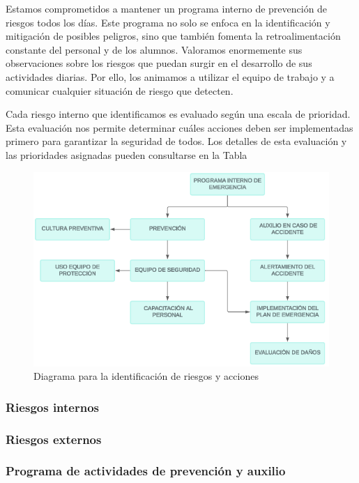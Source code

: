     Estamos comprometidos a mantener un programa interno de prevención de riesgos todos los días. Este programa no solo se enfoca en la identificación y mitigación de posibles peligros, sino que también fomenta la retroalimentación constante del personal y de los alumnos. Valoramos enormemente sus observaciones sobre los riesgos que puedan surgir en el desarrollo de sus actividades diarias. Por ello, los animamos a utilizar el equipo de trabajo y a comunicar cualquier situación de riesgo que detecten.
    
    Cada riesgo interno que identificamos es evaluado según una escala de prioridad. Esta evaluación nos permite determinar cuáles acciones deben ser implementadas primero para garantizar la seguridad de todos. Los detalles de esta evaluación y las prioridades asignadas pueden consultarse en la Tabla 
    
    \begin{figure}[H]
        \centering
        \includegraphics[scale=0.4]{35/Img/diagramaPE.png}
        \caption{Diagrama para la identificación de riesgos y acciones}
    \end{figure}
    
    \subsubsection{Riesgos internos}
    
    \subsubsection{Riesgos externos}
    
    \subsubsection{Programa de actividades de prevención y auxilio}
    
